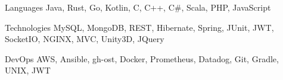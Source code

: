 
\begin{cvskills}

\cvskill
    {Languages}
    {Java, Rust, Go, Kotlin, C, C++, C\#, Scala, PHP, JavaScript}

\cvskill
    {Technologies}
    {MySQL, MongoDB, REST, Hibernate, Spring, JUnit, JWT, SocketIO, NGINX, MVC, Unity3D, JQuery}

\cvskill
    {DevOps}
    {AWS, Ansible, gh-ost, Docker, Prometheus, Datadog, Git, Gradle, UNIX, JWT}

\end{cvskills}
